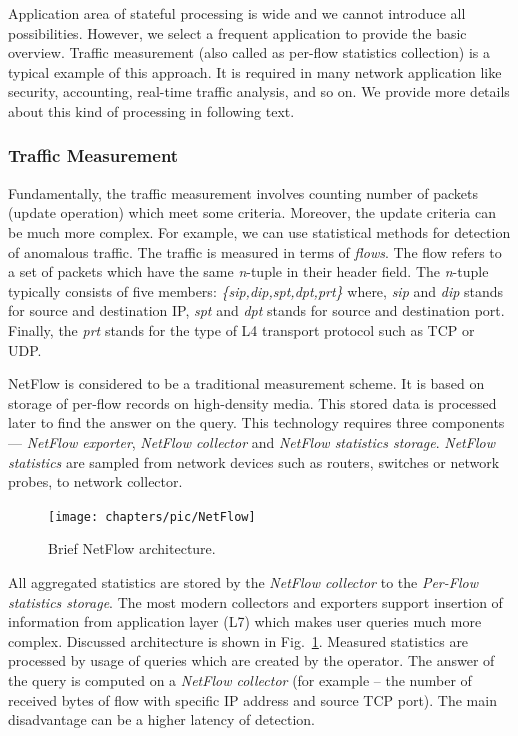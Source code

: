 Application area of stateful processing is wide and we cannot introduce all possibilities.  
However, we select a frequent application to provide the basic overview.
Traffic measurement (also called as per-flow statistics collection) is a typical example of this approach.
It is required in many network application like security, accounting, real-time traffic analysis, and so on. 
We provide more details about this kind of processing in following text.

\subsubsection*{Traffic Measurement}
Fundamentally, the traffic measurement involves counting number of packets (update operation) which meet some criteria. Moreover, the update 
criteria can be much more complex. For example, we can use statistical methods for detection of anomalous traffic. The traffic is measured 
in terms of \textit{flows}. The flow refers to a set of packets which have the same \textit{n}-tuple in their header field. 
The \textit{n}-tuple typically consists of five members: \textit{\{sip,dip,spt,dpt,prt\}} where, \textit{sip} and \textit{dip} stands for 
source and destination IP, \textit{spt} and 
\textit{dpt} stands for source and destination port. Finally, the \textit{prt} stands for the type of L4 transport protocol such as TCP or UDP. 

NetFlow is considered to be a traditional measurement scheme. 
It is based on storage of per-flow records on high-density media.
This stored data is processed later to find the answer on the query. 
This technology requires three components --- \textit{NetFlow exporter}, \textit{NetFlow collector} and \textit{NetFlow statistics storage}. 
\textit{NetFlow statistics} are sampled from network devices such as routers, switches or network probes, to network collector. 

\begin{figure}[ht]
	\centering
	\texttt{[image: chapters/pic/NetFlow]}
	\caption{Brief NetFlow architecture.}
	\label{fig:netflowArchitecture}
\end{figure}

All aggregated statistics are stored by the \textit{NetFlow collector} to the \textit{Per-Flow statistics storage}. 
The most modern collectors and exporters support insertion of information from application layer (L7) which makes user queries much more complex. 
Discussed architecture is shown in Fig.~\ref{fig:netflowArchitecture}. 
Measured statistics are processed by usage of queries which are created by the operator. 
The answer of the query is computed on a \textit{NetFlow collector }
(for example – the number of received bytes of flow with specific IP address and source TCP port). 
The main disadvantage can be a higher latency of detection.

